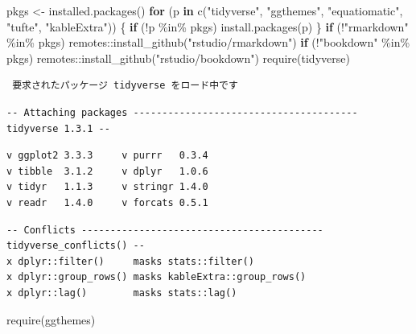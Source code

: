 \documentclass[
  xelatex,ja=standard,jafont=noto]{bxjsbook}
\newenvironment{Shaded}{\begin{snugshade}}{\end{snugshade}}
\newcommand{\ControlFlowTok}[1]{\textcolor[rgb]{0.13,0.29,0.53}{\textbf{#1}}}
\newcommand{\FunctionTok}[1]{\textcolor[rgb]{0.00,0.00,0.00}{#1}}
\newcommand{\NormalTok}[1]{#1}
\newcommand{\OtherTok}[1]{\textcolor[rgb]{0.56,0.35,0.01}{#1}}
\newcommand{\SpecialCharTok}[1]{\textcolor[rgb]{0.00,0.00,0.00}{#1}}
\newcommand{\StringTok}[1]{\textcolor[rgb]{0.31,0.60,0.02}{#1}}
\theoremstyle{definition}
\theoremstyle{definition}
\theoremstyle{definition}
\theoremstyle{definition}
\theoremstyle{remark}
\begin{document}
\begin{Shaded}
\begin{Highlighting}[numbers=left,,]
\NormalTok{pkgs }\OtherTok{\textless{}{-}} \FunctionTok{installed.packages}\NormalTok{()}
\ControlFlowTok{for}\NormalTok{ (p }\ControlFlowTok{in} \FunctionTok{c}\NormalTok{(}\StringTok{"tidyverse"}\NormalTok{, }\StringTok{"ggthemes"}\NormalTok{, }\StringTok{"equatiomatic"}\NormalTok{, }\StringTok{"tufte"}\NormalTok{, }\StringTok{"kableExtra"}\NormalTok{)) \{}
  \ControlFlowTok{if}\NormalTok{ (}\SpecialCharTok{!}\NormalTok{p }\SpecialCharTok{\%in\%}\NormalTok{ pkgs) }\FunctionTok{install.packages}\NormalTok{(p)}
\NormalTok{\}}
\ControlFlowTok{if}\NormalTok{ (}\SpecialCharTok{!}\StringTok{"rmarkdown"} \SpecialCharTok{\%in\%}\NormalTok{ pkgs) remotes}\SpecialCharTok{::}\FunctionTok{install\_github}\NormalTok{(}\StringTok{"rstudio/rmarkdown"}\NormalTok{)}
\ControlFlowTok{if}\NormalTok{ (}\SpecialCharTok{!}\StringTok{"bookdown"} \SpecialCharTok{\%in\%}\NormalTok{ pkgs) remotes}\SpecialCharTok{::}\FunctionTok{install\_github}\NormalTok{(}\StringTok{"rstudio/bookdown"}\NormalTok{)}
\FunctionTok{require}\NormalTok{(tidyverse)}
\end{Highlighting}
\end{Shaded}

\begin{verbatim}
 要求されたパッケージ tidyverse をロード中です 
\end{verbatim}

\begin{verbatim}
-- Attaching packages --------------------------------------- tidyverse 1.3.1 --
\end{verbatim}

\begin{verbatim}
v ggplot2 3.3.3     v purrr   0.3.4
v tibble  3.1.2     v dplyr   1.0.6
v tidyr   1.1.3     v stringr 1.4.0
v readr   1.4.0     v forcats 0.5.1
\end{verbatim}

\begin{verbatim}
-- Conflicts ------------------------------------------ tidyverse_conflicts() --
x dplyr::filter()     masks stats::filter()
x dplyr::group_rows() masks kableExtra::group_rows()
x dplyr::lag()        masks stats::lag()
\end{verbatim}

\begin{Shaded}
\begin{Highlighting}[numbers=left,,]
\FunctionTok{require}\NormalTok{(ggthemes)}
\end{Highlighting}
\end{Shaded}
\end{document}
